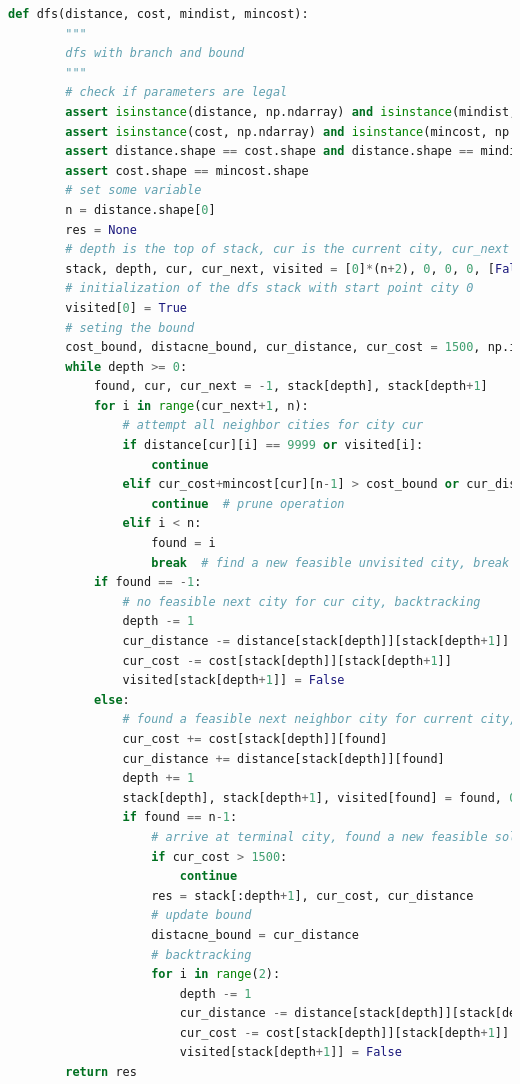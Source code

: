 \documentclass[a4paper,12pt]{article}
\begin{document}
\begin{lstlisting}[language=Python]
    def dfs(distance, cost, mindist, mincost):
        """
        dfs with branch and bound
        """
        # check if parameters are legal
        assert isinstance(distance, np.ndarray) and isinstance(mindist, np.ndarray)
        assert isinstance(cost, np.ndarray) and isinstance(mincost, np.ndarray)
        assert distance.shape == cost.shape and distance.shape == mindist.shape
        assert cost.shape == mincost.shape
        # set some variable
        n = distance.shape[0]
        res = None
        # depth is the top of stack, cur is the current city, cur_next is the next feasible city of current city, visited is flag for all cities if they are visited
        stack, depth, cur, cur_next, visited = [0]*(n+2), 0, 0, 0, [False]*n
        # initialization of the dfs stack with start point city 0
        visited[0] = True
        # seting the bound
        cost_bound, distacne_bound, cur_distance, cur_cost = 1500, np.inf, 0, 0
        while depth >= 0:
            found, cur, cur_next = -1, stack[depth], stack[depth+1]
            for i in range(cur_next+1, n):
                # attempt all neighbor cities for city cur
                if distance[cur][i] == 9999 or visited[i]:
                    continue
                elif cur_cost+mincost[cur][n-1] > cost_bound or cur_distance+mindist[cur][n-1] > distacne_bound:
                    continue  # prune operation
                elif i < n:
                    found = i
                    break  # find a new feasible unvisited city, break the for loop
            if found == -1:
                # no feasible next city for cur city, backtracking
                depth -= 1
                cur_distance -= distance[stack[depth]][stack[depth+1]]
                cur_cost -= cost[stack[depth]][stack[depth+1]]
                visited[stack[depth+1]] = False
            else:
                # found a feasible next neighbor city for current city, update current path with cost, distance, path stack and visited record
                cur_cost += cost[stack[depth]][found]
                cur_distance += distance[stack[depth]][found]
                depth += 1
                stack[depth], stack[depth+1], visited[found] = found, 0, True
                if found == n-1:
                    # arrive at terminal city, found a new feasible solution
                    if cur_cost > 1500:
                        continue
                    res = stack[:depth+1], cur_cost, cur_distance
                    # update bound
                    distacne_bound = cur_distance
                    # backtracking
                    for i in range(2):
                        depth -= 1
                        cur_distance -= distance[stack[depth]][stack[depth+1]]
                        cur_cost -= cost[stack[depth]][stack[depth+1]]
                        visited[stack[depth+1]] = False
        return res


\end{lstlisting}
\end{document}
